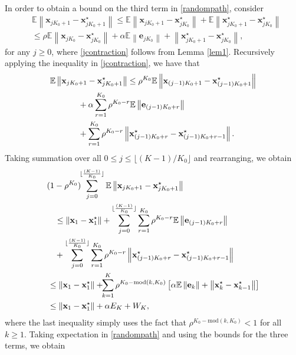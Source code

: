 \documentclass[draftcls,onecolumn,12pt]{IEEEtran}
\theoremstyle{plain}
\def\x{\mathbf{x}}
\def\e{\mathbf{e}}
\def\EE{\mathbb{E}}
\providecommand{\norm}[1]{\left\|#1\right\|}
\theoremstyle{plain}
\theoremstyle{remark}
\begin{document}
In order to obtain a bound on the third term in \eqref{randompath}, consider 
\begin{align}
&\EE\norm{\x_{jK_0+1}\!\!-\!\!\x_{jK_0+1}^\star}\!\!\leq\!\! \EE\norm{\x_{jK_0+1}\!\!-\!\!\x_{jK_0}^\star} \!\!+\!\! \EE\norm{\x_{jK_0+1}^\star\!\!-\!\!\x_{jK_0}^\star} \nonumber\\
&\leq \rho\EE\norm{\x_{jK_0}-\x_{jK_0}^\star} + \alpha \EE\norm{\e_{jK_0}} + \norm{\x_{jK_0+1}^\star-\x_{jK_0}^\star}, \label{jcontraction}
\end{align}
for any $j \geq 0$, where \eqref{jcontraction} follows from Lemma \ref{lem1}. Recursively applying the inequality in \eqref{jcontraction}, we have that
\begin{align}
&\EE\norm{\x_{jK_0+1}-\x_{jK_0+1}^\star} \leq \rho^{K_0}\EE\norm{\x_{(j-1)K_0+1}-\x_{(j-1)K_0+1}^\star} \nonumber\\
&\hspace{1.2cm}+ \alpha \sum_{r = 1}^{K_0}\rho^{K_0-r}\EE\norm{\e_{(j-1)K_0+r}} \nonumber\\
&\hspace{1.2cm}+  \sum_{r = 1}^{K_0}\rho^{K_0-r}\norm{\x_{(j-1)K_0+r}^\star-\x_{(j-1)K_0+r-1}^\star}.
\end{align}
Taking summation over all $0\leq j \leq \lfloor(K-1)/K_0\rfloor$ and rearranging, we obtain
\begin{align}
(1-\rho^{K_0})\!\!&\sum_{j=0}^{\lfloor \frac{(K-1)}{K_0} \rfloor}\EE\norm{\x_{jK_0+1}-\x_{jK_0+1}^\star}\nonumber\\
&\hspace{-1cm}\leq \norm{\x_1-\x_1^\star} + \sum_{j=0}^{\lfloor \frac{(K-1)}{K_0} \rfloor}\sum_{r=1}^{K_0}\rho^{K_0-r}\EE\norm{\e_{(j-1)K_0+r}}\nonumber\\
&\hspace{-1cm}+ \sum_{j=0}^{\lfloor \frac{(K-1)}{K_0} \rfloor}\sum_{r=1}^{K_0}\rho^{K_0-r} \norm{\x_{(j-1)K_0+r}^\star-\x_{(j-1)K_0+r-1}^\star} \nonumber\\
&\hspace{-1.3cm}\leq \norm{\x_1-\x_1^\star} + \!\!\sum_{k=1}^{K}\rho^{K_0-\text{mod}(k,K_0)} \left[\alpha\EE\norm{\e_k} + \norm{\x_k^\star-\x_{k-1}^\star}\right] \nonumber\\
&\hspace{-1.3cm}\leq \norm{\x_1-\x_1^\star} + \alpha E_K + W_K,
\end{align}
where the last inequality simply uses the fact that $\rho^{K_0-\text{mod}(k,K_0)} < 1$ for all $k\geq 1$. Taking expectation in \eqref{randompath} and using the bounds for the three terms, we obtain
\end{document}
